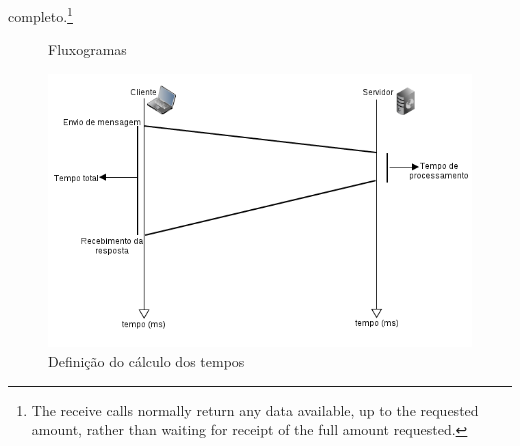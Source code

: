 \documentclass[a4paper,10pt]{article}
\begin{document}
completo.\footnote{The receive calls normally return any data available, up to
the requested amount, rather than waiting for receipt of the full amount
requested.} \begin{figure}[!htb]
  \centering
  \quad %
   \caption{Fluxogramas}
   \label{figfluxos}
\end{figure}
\begin{figure}[!htb]
  \centering
  \label{fluxotempo}
  \includegraphics[scale=0.5]{fluxo_tempo.png}
  \caption{Definição do cálculo dos tempos}
\end{figure}
\newpage
\end{document}

